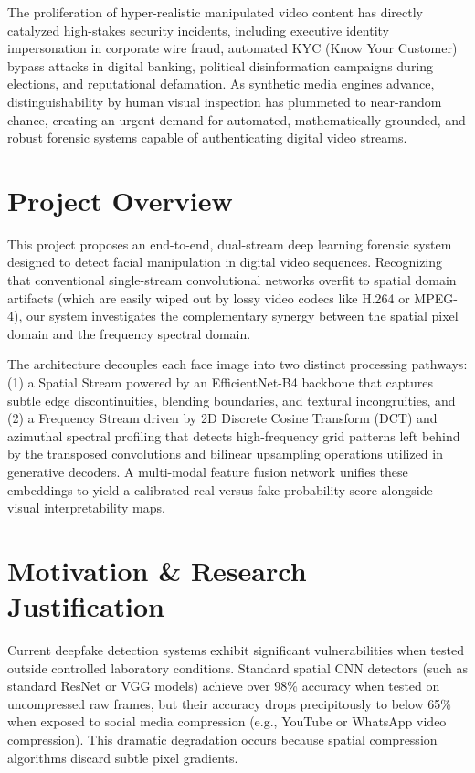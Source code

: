 \documentclass[12pt,a4paper]{report}
\begin{document}
The proliferation of hyper-realistic manipulated video content has directly catalyzed high-stakes security incidents, including executive identity impersonation in corporate wire fraud, automated KYC (Know Your Customer) bypass attacks in digital banking, political disinformation campaigns during elections, and reputational defamation. As synthetic media engines advance, distinguishability by human visual inspection has plummeted to near-random chance, creating an urgent demand for automated, mathematically grounded, and robust forensic systems capable of authenticating digital video streams.

\section{Project Overview}
This project proposes an end-to-end, dual-stream deep learning forensic system designed to detect facial manipulation in digital video sequences. Recognizing that conventional single-stream convolutional networks overfit to spatial domain artifacts (which are easily wiped out by lossy video codecs like H.264 or MPEG-4), our system investigates the complementary synergy between the spatial pixel domain and the frequency spectral domain.

The architecture decouples each face image into two distinct processing pathways: (1) a Spatial Stream powered by an EfficientNet-B4 backbone that captures subtle edge discontinuities, blending boundaries, and textural incongruities, and (2) a Frequency Stream driven by 2D Discrete Cosine Transform (DCT) and azimuthal spectral profiling that detects high-frequency grid patterns left behind by the transposed convolutions and bilinear upsampling operations utilized in generative decoders. A multi-modal feature fusion network unifies these embeddings to yield a calibrated real-versus-fake probability score alongside visual interpretability maps.

\section{Motivation \& Research Justification}
Current deepfake detection systems exhibit significant vulnerabilities when tested outside controlled laboratory conditions. Standard spatial CNN detectors (such as standard ResNet or VGG models) achieve over 98\% accuracy when tested on uncompressed raw frames, but their accuracy drops precipitously to below 65\% when exposed to social media compression (e.g., YouTube or WhatsApp video compression). This dramatic degradation occurs because spatial compression algorithms discard subtle pixel gradients.
\end{document}
